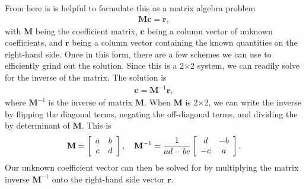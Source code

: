 From here is is helpful to formulate this as a matrix algebra problem 
\begin{align}
  \mathbf{M c} = \mathbf{r}, \nonumber
\end{align}
with $\mathbf{M}$ being the coefficient matrix, $\mathbf{c}$ being a column vector of unknown coefficients, and $\mathbf{r}$ being a column vector containing the known quantities on the right-hand side. Once in this form, there are a few schemes we can use to efficiently grind out the solution. Since this is a 2$\times$2 system, we can readily solve for the inverse of the matrix. The solution is
\begin{align}
  \mathbf{c} = \mathbf{M}^{-1} \mathbf{r}, \nonumber
\end{align}
where $\mathbf{M}^{-1}$ is the inverse of matrix $\mathbf{M}$. When $\mathbf{M}$ is 2$\times$2, we can write the inverse by flipping the diagonal terms, negating the off-diagonal terms, and dividing the by determinant of $\mathbf{M}$. This is
\begin{align}
  \mathbf{M} = \left[ \begin{array}{c c}
  a & b \\
  c & d \\ \end{array} \right], \quad
  \mathbf{M}^{-1} = \frac{1}{ad - bc} \left[ \begin{array}{c c}
  d & -b \\
  -c & a \\ \end{array} \right] . 
\end{align}
Our unknown coefficient vector can then be solved for by multiplying the matrix inverse $\mathbf{M}^{-1}$ onto the right-hand side vector $\mathbf{r}$.


